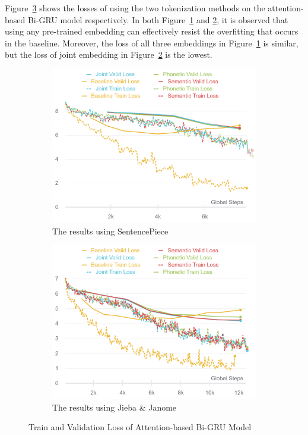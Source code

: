 Figure~\ref{fig:seq2seq_loss} shows the losses of using the two tokenization methods on the attention-based Bi-GRU model respectively. In both Figure~\ref{fig:seq2seq_loss_sp} and \ref{fig:seq2seq_loss_jj}, it is observed that using any pre-trained embedding can effectively resist the overfitting that occurs in the baseline. Moreover, the loss of all three embeddings in Figure~\ref{fig:seq2seq_loss_sp} is similar, but the loss of joint embedding in Figure~\ref{fig:seq2seq_loss_jj} is the lowest.

\begin{figure}[t]
    \centering
    \begin{subfigure}[b]{0.495\textwidth}
        \centering
        \includegraphics[width=\textwidth]{../images/rnn_sp.png}
        \caption{The results using SentencePiece}
        \label{fig:seq2seq_loss_sp}
    \end{subfigure}
    \hfill
    \begin{subfigure}[b]{0.495\textwidth}
        \centering
        \includegraphics[width=\textwidth]{../images/rnn_jj.png}
        \caption{The results using Jieba \& Janome}
        \label{fig:seq2seq_loss_jj}
    \end{subfigure}
    \caption{Train and Validation Loss of Attention-based Bi-GRU Model}
	\label{fig:seq2seq_loss}
\end{figure}

